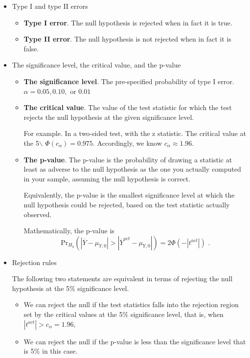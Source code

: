 \documentclass[a4paper,11pt]{article}
\newcommand{\pr}{\mathrm{Pr}}
\begin{document}
\begin{itemize}
\item Type I and type II errors
\label{sec:orgbc73d89}
\begin{itemize}
\item \textbf{Type I error}. The null hypothesis is rejected when in fact it is
true.
\item \textbf{Type II error}. The null hypothesis is not rejected when in fact it
is false.
\end{itemize}

\item The significance level, the critical value, and the p-value
\label{sec:org125a391}
\begin{itemize}
\item \textbf{The significance level}. The pre-specified probability of type I
error.  \(\alpha = 0.05, 0.10, \text{ or } 0.01\)

\item \textbf{The critical value}. The value of the test statistic for which the
test rejects the null hypothesis at the given significance level.

For example. In a two-sided test, with the z statistic. The critical
value at the 5$\backslash$%
\(\varPhi(c_{\alpha}) = 0.975\). Accordingly, we know \(c_{\alpha}
  \approx 1.96\).

\item \textbf{The p-value}. The p-value is the probability of drawing a statistic
at least as adverse to the null hypothesis as the one you actually
computed in your sample, assuming the null hypothesis is
correct. 

Equivalently, the p-value is the smallest significance
level at which the null hypothesis could be rejected, based on the
test statistic actually observed.

Mathematically, the p-value is 
\[  \pr_{H_0}\left( \left| \overline{Y} - \mu_{Y,0}
  \right| > \left| \overline{Y}^{act} - \mu_{Y,0} \right| \right) =
  2\varPhi(-|t^{act}|) \text{ .} \]
\end{itemize}

\item Rejection rules
\label{sec:orgc755ea2}

The following two statements are equivalent in terms of rejecting the
null hypothesis at the 5\% significance level. 

\begin{itemize}
\item We can reject the null if the test statistics falls into the
rejection region set by the critical values at the 5\% significance
level, that is, when \(|t^{act}| > c_{\alpha} = 1.96\),
\item We can reject the null if the p-value is less than the significance
level that is 5\% in this case.
\end{itemize}


\end{itemize}
\end{document}
